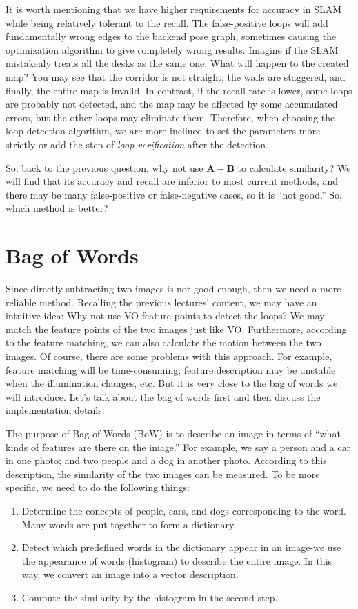 It is worth mentioning that we have higher requirements for accuracy in SLAM while being relatively tolerant to the recall. The false-positive loops will add fundamentally wrong edges to the backend pose graph, sometimes causing the optimization algorithm to give completely wrong results. Imagine if the SLAM mistakenly treats all the desks as the same one. What will happen to the created map? You may see that the corridor is not straight, the walls are staggered, and finally, the entire map is invalid. In contrast, if the recall rate is lower, some loops are probably not detected, and the map may be affected by some accumulated errors, but the other loops may eliminate them. Therefore, when choosing the loop detection algorithm, we are more inclined to set the parameters more strictly or add the step of \textit{loop verification} after the detection.

So, back to the previous question, why not use $\mathbf{A}-\mathbf{B}$ to calculate similarity? We will find that its accuracy and recall are inferior to most current methods, and there may be many false-positive or false-negative cases, so it is ``not good.'' So, which method is better?

\section{Bag of Words}
Since directly subtracting two images is not good enough, then we need a more reliable method. Recalling the previous lectures' content, we may have an intuitive idea: Why not use VO feature points to detect the loops? We may match the feature points of the two images just like VO. Furthermore, according to the feature matching, we can also calculate the motion between the two images. Of course, there are some problems with this approach. For example, feature matching will be time-consuming, feature description may be unstable when the illumination changes, etc. But it is very close to the bag of words we will introduce. Let's talk about the bag of words first and then discuss the implementation details.

The purpose of Bag-of-Words (BoW) is to describe an image in terms of ``what kinds of features are there on the image.'' For example, we say a person and a car in one photo; and two people and a dog in another photo. According to this description, the similarity of the two images can be measured. To be more specific, we need to do the following things:

\begin{enumerate}
	\item Determine the concepts of people, cars, and dogs-corresponding to the word. Many words are put together to form a dictionary.
	\item Detect which predefined words in the dictionary appear in an image-we use the appearance of words (histogram) to describe the entire image. In this way, we convert an image into a vector description.
	\item Compute the similarity by the histogram in the second step.
\end{enumerate}

